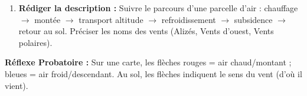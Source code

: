 \documentclass[11pt]{article}
\begin{document}
\begin{methode}
\begin{enumerate}
\begin{itemize}
                  \item \textbf{Pôles :} Haute pression thermique, air très froid et sec.
              \end{itemize}
        \item \textbf{Rédiger la description :} Suivre le parcours d'une parcelle d'air : chauffage $\rightarrow$ montée $\rightarrow$ transport altitude $\rightarrow$ refroidissement $\rightarrow$ subsidence $\rightarrow$ retour au sol. Préciser les noms des vents (Alizés, Vents d'ouest, Vents polaires).
    \end{enumerate}
    \textbf{Réflexe Probatoire :} Sur une carte, les flèches rouges = air chaud/montant ; bleues = air froid/descendant. Au sol, les flèches indiquent le sens du vent (d'où il vient).
\end{methode}
\end{document}
